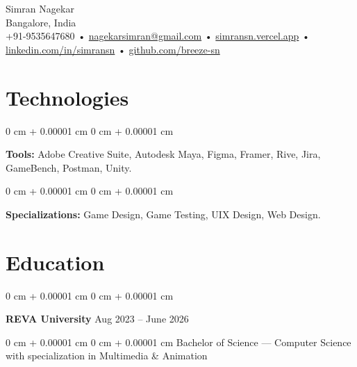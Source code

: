 \documentclass[10pt, letterpaper]{article}
\newenvironment{onecolentry}{
    \begin{adjustwidth}{
        0 cm + 0.00001 cm
    }{
        0 cm + 0.00001 cm
    }
}{
    \end{adjustwidth}
} %
\newenvironment{twocolentry}[2][]{
    \onecolentry
    \def\secondColumn{#2}
    \setcolumnwidth{\fill, 4.5 cm}
    \begin{paracol}{2}
}{
    \switchcolumn \raggedleft \secondColumn
    \end{paracol}
    \endonecolentry
} %
\newenvironment{header}{
    \setlength{\topsep}{0pt}\par\kern\topsep\raggedright\linespread{1.5}
}{
    \par\kern\topsep
} %
\begin{document}
    \newcommand{\AND}{\unskip
        \cleaders\copy\ANDbox\hskip\wd\ANDbox
        \ignorespaces
    }
    \newsavebox\ANDbox
    \sbox\ANDbox{$|$}

    \begin{header}
    {\color{secondaryColor} \fontsize{25pt}{25pt}\selectfont Simran Nagekar}\\
    \vspace{1pt}
    Bangalore, India\\
    \vspace{2pt}
     \color{secondaryColor}  +91-9535647680 • \href{mailto:nagekarsimran@gmail.com}{\color{secondaryColor}nagekarsimran@gmail.com} • \href{https://simransn.vercel.app/}{\color{secondaryColor}simransn.vercel.app} •
    \href{https://linkedin.com/in/simransn}{\color{secondaryColor}linkedin.com/in/simransn} •
    \href{https://github.com/breeze-sn}{\color{secondaryColor}github.com/breeze-sn}  
\end{header}

    \vspace{5 pt - 0.3 cm}

     
    \section{\color{secondaryColor}Technologies}


        \vspace{0.1 cm}

        \begin{onecolentry}
            \textbf{Tools:} Adobe Creative Suite, Autodesk Maya, Figma, Framer, Rive, Jira, GameBench, Postman, Unity.
        \end{onecolentry}

        \vspace{0.1 cm}

        \begin{onecolentry}
            \textbf{Specializations:} Game Design, Game Testing, UIX Design, Web Design.
        \end{onecolentry}


    \section{\color{secondaryColor}Education} 
        \begin{twocolentry}{
            Aug 2023 – June 2026
        }
            \textbf{REVA University}\end{twocolentry}
            \begin{onecolentry} Bachelor of Science — Computer Science with specialization in Multimedia \& Animation \end{onecolentry}
\end{document}
